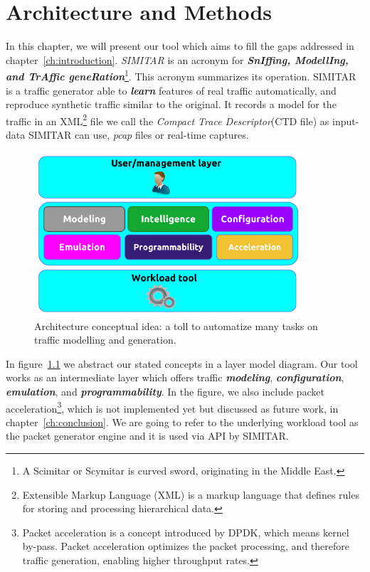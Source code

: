 \chapter{Architecture and Methods}\label{ch:architecture}

In this chapter, we will present our tool which aims to fill the gaps addressed in chapter~\ref{ch:introduction}. \textit{SIMITAR} is an acronym for \textbf{\textit{SnIffing, ModellIng, and TrAffic geneRation}}\footnote{A Scimitar or Scymitar is curved sword, originating in the Middle East\cite{scymitar-sword}.}. This acronym summarizes its operation.
SIMITAR is a traffic generator able to \textbf{\textit{learn}} features of real traffic automatically, and reproduce synthetic traffic similar to the original. It records a model for the traffic in an \acrshort{XML}\footnote{Extensible Markup Language (XML) is a markup language that defines rules for storing and processing hierarchical data\cite{web-xml}.} file we call the \textit{Compact Trace Descriptor}(CTD file) as input-data SIMITAR can use, \textit{pcap} files or real-time captures. 

\begin{figure}[ht!]
    \centering
    \includegraphics[height=2.4in]{figures/ch1/layer-diagram}
    \caption{ Architecture conceptual idea: a toll to automatize many tasks on traffic modelling and generation.}
    \label{fig:layer-diagram}
\end{figure}

In figure~\ref{fig:layer-diagram} we abstract our stated concepts in a layer model diagram. Our tool works as an intermediate layer which offers traffic \textbf{\textit{modeling}}, \textbf{\textit{configuration}}, \textbf{\textit{emulation}}, and \textbf{\textit{programmability}}. In the figure, we also include packet acceleration\footnote{Packet acceleration is a concept introduced by DPDK\cite{web-dpdk}, which means kernel by-pass. Packet acceleration optimizes the packet processing, and therefore traffic generation, enabling higher throughput rates.}, which is not implemented yet but discussed as future work, in chapter~\ref{ch:conclusion}.  We are going to refer to the underlying workload tool as the packet generator engine and it is used via API by SIMITAR. 

